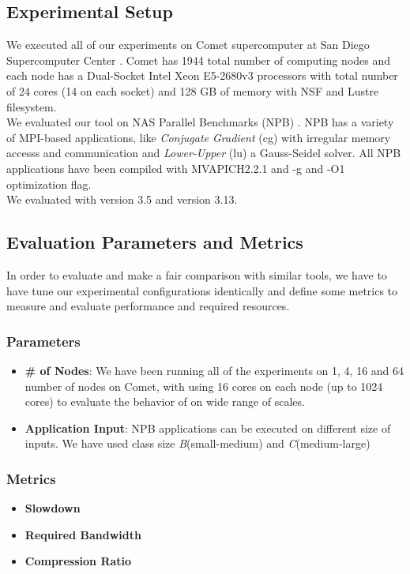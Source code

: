 \subsection{Experimental Setup}
We executed all of our experiments on Comet \cite{comet} supercomputer at San Diego Supercomputer Center . Comet has 1944 total number of computing nodes and each node has a Dual-Socket Intel Xeon E5-2680v3 processors with total number of 24 cores (14 on each socket) and 128 GB of memory with NSF and Lustre filesystem.\\
We evaluated our tool on NAS Parallel Benchmarks (NPB) \cite{nas}. NPB has a variety of MPI-based applications, like \textit{Conjugate Gradient} (cg) with irregular memory accesss and communication and \textit{Lower-Upper} (lu) a Gauss-Seidel solver. All NPB applications have been compiled with MVAPICH2.2.1 and -g and -O1 optimization flag.\\
We evaluated \parlot with \pin version 3.5 and \callgrind version 3.13.

\subsection{Evaluation Parameters and Metrics}
In order to evaluate \parlot and make a fair comparison with similar tools, we have to have tune our experimental configurations identically and define some metrics to measure and evaluate performance and required resources.
\subsubsection{Parameters}
\begin{itemize}
\item \textbf{\# of Nodes}: We have been running all of the experiments on 1, 4, 16 and 64 number of nodes on Comet, with using 16 cores on each node (up to 1024 cores) to evaluate the behavior of \parlot on wide range of scales.
\item \textbf{Application Input}: NPB applications can be executed on different size of inputs. We have used class size \textit{B}(small-medium) and \textit{C}(medium-large)
\end{itemize}

\subsubsection{Metrics}

\begin{itemize}
\item \textbf{Slowdown}
\item \textbf{Required Bandwidth}
\item \textbf{Compression Ratio}
\end{itemize}

